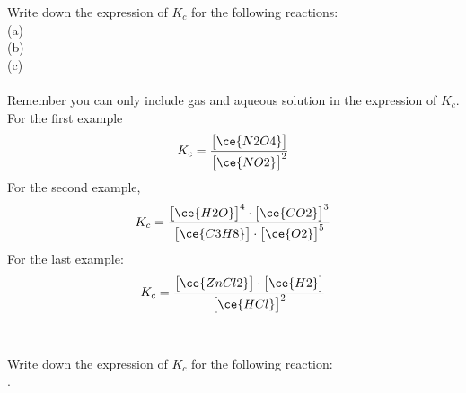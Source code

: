 \documentclass[main.tex]{subfiles}
\begin{document}
\begin{description}
\begin{example} %
Write down the expression of $K_c$ for the following reactions:\\
(a) \\
(b) \\
(c) 
\\
\\
Remember you can only include gas and aqueous solution in the expression of $K_c$. For the first example
\begin{equation*} K_{c}=\frac{\big[ \ce{N2O4} \big]} {\big[ \ce{NO2} \big]^2 } \end{equation*}
For the second example,
 \begin{equation*} K_{c}=\frac{\big[ \ce{H2O} \big]^4 \cdot \big[ \ce{CO2} \big]^3} {\big[ \ce{C3H8} \big] \cdot \big[ \ce{O2} \big]^5} \end{equation*}
For the last example:
\begin{equation*}  K_{c}=\frac{\big[ \ce{ZnCl2} \big] \cdot \big[ \ce{H2} \big]} {\big[ \ce{HCl} \big]^2}\end{equation*} 
\\
\faDiamond\ \\
Write down the expression of $K_c$ for the following reaction:\\
 .
\end{example}%



\end{description}
\end{document}
